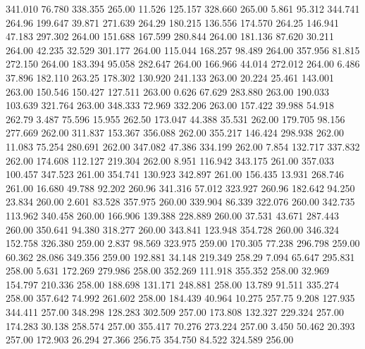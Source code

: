  341.010   76.780  338.355       265.00
  11.526  125.157  328.660       265.00
   5.861   95.312  344.741       264.96
 199.647   39.871  271.639       264.29
 180.215  136.556  174.570       264.25
 146.941   47.183  297.302       264.00
 151.688  167.599  280.844       264.00
 181.136   87.620   30.211       264.00
  42.235   32.529  301.177       264.00
 115.044  168.257   98.489       264.00
 357.956   81.815  272.150       264.00
 183.394   95.058  282.647       264.00
 166.966   44.014  272.012       264.00
   6.486   37.896  182.110       263.25
 178.302  130.920  241.133       263.00
  20.224   25.461  143.001       263.00
 150.546  150.427  127.511       263.00
   0.626   67.629  283.880       263.00
 190.033  103.639  321.764       263.00
 348.333   72.969  332.206       263.00
 157.422   39.988   54.918       262.79
   3.487   75.596   15.955       262.50
 173.047   44.388   35.531       262.00
 179.705   98.156  277.669       262.00
 311.837  153.367  356.088       262.00
 355.217  146.424  298.938       262.00
  11.083   75.254  280.691       262.00
 347.082   47.386  334.199       262.00
   7.854  132.717  337.832       262.00
 174.608  112.127  219.304       262.00
   8.951  116.942  343.175       261.00
 357.033  100.457  347.523       261.00
 354.741  130.923  342.897       261.00
 156.435   13.931  268.746       261.00
  16.680   49.788   92.202       260.96
 341.316   57.012  323.927       260.96
 182.642   94.250   23.834       260.00
   2.601   83.528  357.975       260.00
 339.904   86.339  322.076       260.00
 342.735  113.962  340.458       260.00
 166.906  139.388  228.889       260.00
  37.531   43.671  287.443       260.00
 350.641   94.380  318.277       260.00
 343.841  123.948  354.728       260.00
 346.324  152.758  326.380       259.00
   2.837   98.569  323.975       259.00
 170.305   77.238  296.798       259.00
  60.362   28.086  349.356       259.00
 192.881   34.148  219.349       258.29
   7.094   65.647  295.831       258.00
   5.631  172.269  279.986       258.00
 352.269  111.918  355.352       258.00
  32.969  154.797  210.336       258.00
 188.698  131.171  248.881       258.00
  13.789   91.511  335.274       258.00
 357.642   74.992  261.602       258.00
 184.439   40.964   10.275       257.75
   9.208  127.935  344.411       257.00
 348.298  128.283  302.509       257.00
 173.808  132.327  229.324       257.00
 174.283   30.138  258.574       257.00
 355.417   70.276  273.224       257.00
   3.450   50.462   20.393       257.00
 172.903   26.294   27.366       256.75
 354.750   84.522  324.589       256.00
